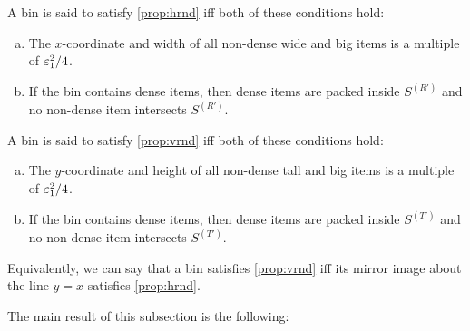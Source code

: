 \begin{comment}
\begin{figure}[htb]
\centering

\caption{Strips $S^{(T)}$, $S^{(B)}$, $S^{(L)}$ and $S^{(R)}$.}
\label{fig:4-strips}
\end{figure}
\end{comment}

\begin{property}
\label{prop:hrnd}
A bin is said to satisfy \cref{prop:hrnd} iff both of these conditions hold:
\begin{enumerate}[(a)]
\item \label{item:hrnd:geom} The $x$-coordinate and width of all non-dense wide and big items
    is a multiple of $\varepsilon_1^2/4$.
\item \label{item:hrnd:dense} If the bin contains dense items, then dense items
are packed inside $S^{(R')}$ and no non-dense item intersects $S^{(R')}$.
\end{enumerate}
\end{property}

\begin{property}
\label{prop:vrnd}
A bin is said to satisfy \cref{prop:vrnd} iff both of these conditions hold:
\begin{enumerate}[(a)]
\item \label{item:vrnd:geom} The $y$-coordinate and height of all non-dense tall and big items
    is a multiple of $\varepsilon_1^2/4$.
\item \label{item:vrnd:dense} If the bin contains dense items, then dense items
are packed inside $S^{(T')}$ and no non-dense item intersects $S^{(T')}$.
\end{enumerate}
\end{property}

Equivalently, we can say that a bin satisfies \cref{prop:vrnd} iff
its mirror image about the line $y = x$ satisfies \cref{prop:hrnd}.

The main result of this subsection is the following:

